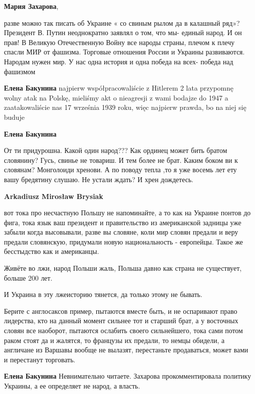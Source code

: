 \begin{itemize} %
\textbf{Мария Захарова}, 

разве можно так писать об Украине « со свиным рылом да в калашный ряд»?
Президент В. Путин неоднократно заявлял о том, что мы- единый народ. И он прав!
В Великую Отечественную Войну все народы страны, плечом к плечу спасли МИР от
фашизма. Торговые отношения России и Украины развиваются. Народам нужен мир. У
нас одна история и одна победа на всех- победа над фашизмом

\begin{itemize} %
\textbf{Елена Бакунина} najpierw współpracowaliście z Hitlerem 2 lata przypomnę wolny atak na Polskę, mieliśmy akt o nieagresji z wami bodajze do 1947 a zaatakowaliście nas 17 września 1939 roku, więc najpierw prawda, bo na niej się buduje

\textbf{Елена Бакунина} 

От ти придурошна. Какой один народ??? Как ординец может
бить братом словянину? Гусь, свинье не товариш. И тем более не брат. Каким
боком ви к словянам? Монголоиди хренови. А по поводу тепла ,то я уже восемь лет
ету вашу бредятину слушаю. Не устали ждать? И хрен дождетесь.

\textbf{Arkadiusz Mirosław Brysiak} 

вот тока про несчастную Польшу не напоминайте, а то как на Украине понтов до
фига, тока язык ваш президент и правительство из американской задницы уже
забыли когда высовывали, разве вы словяне, коли мир словян предали и веру
предали словянскую, придумали новую национальность - европейцы. Такое же
бесстыдство как и американцы.

Живёте во лжи, народ Польши жаль, Польша давно как страна не существует, больше
200 лет.

И Украина в эту лжеисторию тянется, да только этому не бывать.

Берите с англосаксов пример, пытаются вместе быть, и не оспаривают право
лидерства, кто на данный момент сильнее тот и старший брат, а у восточных
словян все наоборот, пытаются ослабить своего сильнейшего, тока сами потом
раком стоят да и жалятся, то французы их предали, то немцы обидели, а англичане
из Варшавы вообще не вылазят, перестаньте продаваться, может вами и перестанут
торговать.

\textbf{Елена Бакунина} Невнимательно читаете. Захарова прокомментировала политику Украины, а ее определяет не народ, а власть.


\end{itemize}
\end{itemize}
